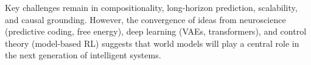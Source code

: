 \documentclass{tufte-handout}
\begin{document}
Key challenges remain in compositionality, long-horizon prediction, scalability, and causal
grounding. However, the convergence of ideas from neuroscience (predictive coding, free energy),
deep learning (VAEs, transformers), and control theory (model-based RL) suggests that world
models will play a central role in the next generation of intelligent systems.



\end{document}
